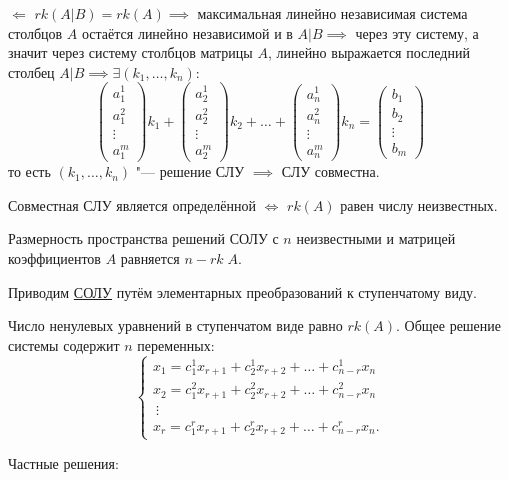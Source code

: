 \begin{Proof}
$\Leftarrow$ $rk(A|B) = rk(A)\implies$ максимальная линейно независимая система столбцов $A$ остаётся линейно независимой и в $A|B\implies$ через эту систему, а значит через систему столбцов матрицы $A$, линейно выражается последний столбец $A|B\implies\exists(k_1,\ldots,k_n)$:
\begin{equation*}
    \begin{pmatrix}
        a_1^1 \\
        a_1^2 \\
        \vdots \\
        a_1^m
    \end{pmatrix} k_1 +
    \begin{pmatrix}
        a_2^1 \\
        a_2^2 \\
        \vdots \\
        a_2^m
    \end{pmatrix} k_2 + \ldots + 
    \begin{pmatrix}
        a_n^1 \\
        a_n^2 \\
        \vdots \\
        a_n^m
    \end{pmatrix} k_n = 
    \begin{pmatrix}
        b_1 \\
        b_2 \\
        \vdots \\
        b_m
    \end{pmatrix}
\end{equation*}
то есть $(k_1,\ldots, k_n)$ "--- решение СЛУ $\implies$ СЛУ совместна.
\end{Proof}

\begin{theorem}
    Совместная СЛУ является определённой $\Leftrightarrow$ $rk(A)$ равен числу неизвестных.
\end{theorem}

\begin{theorem}
    Размерность пространства решений СОЛУ с $n$ неизвестными и матрицей коэффициентов $A$ равняется $n - rk\;A$.
\end{theorem}
\begin{Proof}
    Приводим \hyperref[eq:SOLU]{СОЛУ} путём элементарных преобразований к ступенчатому виду.

    Число ненулевых уравнений в ступенчатом виде равно $rk(A)$. 
    Общее решение системы содержит $n$ переменных:
    $$
    \begin{cases}
        x_1 = c_1^1x_{r + 1} + c_2^1x_{r + 2} + \ldots + c_{n - r}^1x_n \\
        x_2 = c_1^2x_{r + 1} + c_2^2x_{r + 2} + \ldots + c_{n - r}^2x_n \\
        ~\vdots \\
        x_r = c_1^rx_{r + 1} + c_2^rx_{r + 2} + \ldots + c_{n - r}^rx_n.
    \end{cases}
    $$
\end{Proof}
Частные решения:

